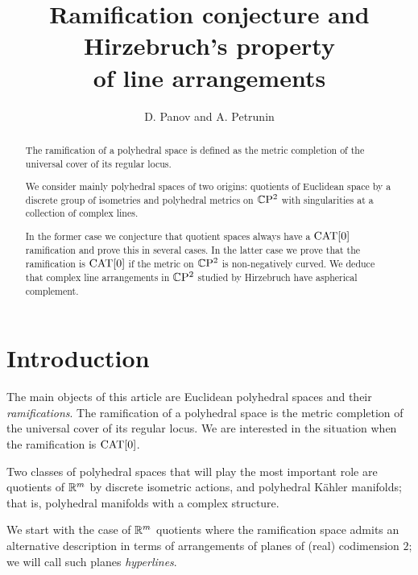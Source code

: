 \documentclass[oneside,a4paper]{article}
\begin{document}
\title{Ramification conjecture and \\
Hirzebruch's property\\ of line arrangements}
\author{D. Panov and A. Petrunin}
\date{}
\maketitle


\begin{abstract}

The ramification of a polyhedral space is defined as the metric completion of the universal cover of its regular locus.

We consider mainly 
polyhedral spaces of two origins: quotients of Euclidean space by a discrete group of isometries and polyhedral metrics on $\mathbb{C}\mathrm{P}^2$ with singularities at a collection of complex lines. 

In the former case we conjecture that quotient spaces always have a $\mathrm{CAT}[0]$ ramification and prove this in several cases.  In the latter case  we prove that the ramification is $\mathrm{CAT}[0]$ if the metric on $\mathbb{C}\mathrm{P}^2$ is non-negatively curved. We deduce that complex line arrangements in $\mathbb{C}\mathrm{P}^2$ studied by Hirzebruch have aspherical complement.
\end{abstract}


\section{Introduction}

The main objects of this article are Euclidean polyhedral spaces and their \emph {ramifications}. The ramification  of a polyhedral space is the metric completion of the universal cover of its regular locus. We are interested in the situation when the ramification is $\mathrm{CAT}[0]$. 

Two classes of polyhedral spaces that will play the most important role are quotients of $\mathbb{R}^m$ by discrete isometric actions, and polyhedral K\"ahler manifolds; 
that is, polyhedral manifolds with a complex structure. 

We start with the case of $\mathbb{R}^m$ quotients where the ramification space admits an alternative description in terms of  arrangements of planes of (real) codimension $2$;
we will call such planes \emph{hyperlines}.
\end{document}
